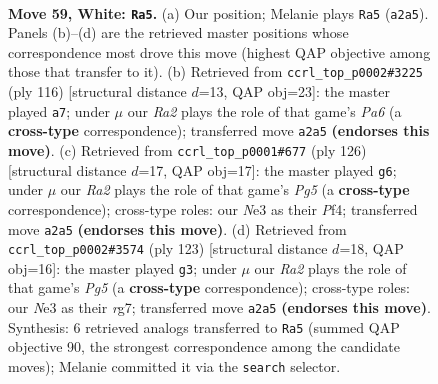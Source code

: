 \documentclass[11pt]{article}
\begin{document}
\clearpage

\begin{figure}[p]\centering
\begin{subfigure}{0.46\textwidth}\centering
\resizebox{\linewidth}{!}{%
\newchessgame
\chessboard[
  setfen={6k1/1r4b1/6R1/8/2P5/4N2K/R7/8 w - - 38 59},
  showmover=false,
  pgfstyle=straightmove, color=movearrow, markmove={a2-a5}
]}
\caption{}
\end{subfigure}\hfill
\begin{subfigure}{0.46\textwidth}\centering
\resizebox{\linewidth}{!}{%
\newchessgame
\chessboard[
  setfen={8/8/P7/3kb1R1/1P6/7r/2K5/8 w - - 1 59},
  showmover=false,
  pgfstyle=straightmove, color=movearrow, markmove={a6-a7}
]}
\caption{}
\end{subfigure}
\\[4pt]
\begin{subfigure}{0.46\textwidth}\centering
\resizebox{\linewidth}{!}{%
\newchessgame
\chessboard[
  setfen={8/3kb2R/8/6P1/5P2/8/4K3/1r6 w - - 1 64},
  showmover=false,
  pgfstyle=straightmove, color=movearrow, markmove={g5-g6}
]}
\caption{}
\end{subfigure}\hfill
\begin{subfigure}{0.46\textwidth}\centering
\resizebox{\linewidth}{!}{%
\newchessgame
\chessboard[
  setfen={3k4/6R1/8/4K3/4B1p1/8/8/4r3 b - - 1 62},
  showmover=false,
  pgfstyle=straightmove, color=movearrow, markmove={g4-g3}
]}
\caption{}
\end{subfigure}
\caption{\textbf{Move 59, White: \texttt{Ra5}.} (a) Our position; Melanie plays \texttt{Ra5} (\texttt{a2a5}). Panels (b)--(d) are the retrieved master positions whose correspondence most drove this move (highest QAP objective among those that transfer to it). (b) Retrieved from \texttt{ccrl\_top\_p0002\#3225} (ply 116) [structural distance $d$=13, QAP obj=23]: the master played \texttt{a7}; under $\mu$ our \emph{Ra2} plays the role of that game's \emph{Pa6} (a \textbf{cross-type} correspondence); transferred move \texttt{a2a5} \textbf{(endorses this move)}. (c) Retrieved from \texttt{ccrl\_top\_p0001\#677} (ply 126) [structural distance $d$=17, QAP obj=17]: the master played \texttt{g6}; under $\mu$ our \emph{Ra2} plays the role of that game's \emph{Pg5} (a \textbf{cross-type} correspondence); cross-type roles: our \emph{N}e3 as their \emph{P}f4; transferred move \texttt{a2a5} \textbf{(endorses this move)}. (d) Retrieved from \texttt{ccrl\_top\_p0002\#3574} (ply 123) [structural distance $d$=18, QAP obj=16]: the master played \texttt{g3}; under $\mu$ our \emph{Ra2} plays the role of that game's \emph{Pg5} (a \textbf{cross-type} correspondence); cross-type roles: our \emph{N}e3 as their \emph{r}g7; transferred move \texttt{a2a5} \textbf{(endorses this move)}. Synthesis: 6 retrieved analogs transferred to \texttt{Ra5} (summed QAP objective 90, the strongest correspondence among the candidate moves); Melanie committed it via the \texttt{search} selector.}
\label{fig:thought-m116}
\end{figure}
\end{document}

